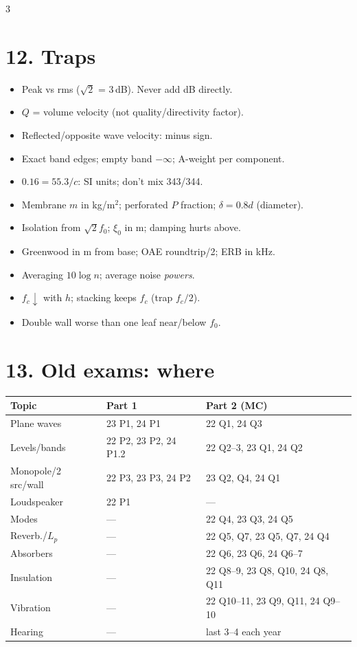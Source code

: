 \documentclass[10pt]{article}
\newcommand{\trap}[1]{\textcolor{trap}{#1}}
\begin{document}
\begin{multicols*}{3}
\section{12. Traps}
\begin{itemize}
\item \trap{Peak vs rms} ($\sqrt2$ = 3\,dB). Never add dB directly.
\item $Q$ = volume velocity (not quality/directivity factor).
\item Reflected/opposite wave velocity: minus sign.
\item Exact band edges; empty band $-\infty$; A-weight per component.
\item $0.16=55.3/c$: SI units; don't mix 343/344.
\item Membrane $m$ in kg/m$^2$; perforated $P$ fraction; $\delta=0.8d$ (diameter).
\item Isolation from $\sqrt2f_0$; $\xi_0$ in m; damping hurts above.
\item Greenwood in m from base; OAE roundtrip/2; ERB in kHz.
\item Averaging $10\log n$; average noise \emph{powers}.
\item $f_c\downarrow$ with $h$; stacking keeps $f_c$ (trap $f_c/2$).
\item Double wall worse than one leaf near/below $f_0$.
\end{itemize}

\section{13. Old exams: where}
{\scriptsize
\begin{tabular}{@{}p{}p{}p{}@{}}
\toprule
Topic & Part 1 & Part 2 (MC)\\\midrule
Plane waves & 23 P1, 24 P1 & 22 Q1, 24 Q3\\
Levels/bands & 22 P2, 23 P2, 24 P1.2 & 22 Q2--3, 23 Q1, 24 Q2\\
Monopole/2 src/wall & 22 P3, 23 P3, 24 P2 & 23 Q2, Q4, 24 Q1\\
Loudspeaker & 22 P1 & ---\\
Modes & --- & 22 Q4, 23 Q3, 24 Q5\\
Reverb./$L_p$ & --- & 22 Q5, Q7, 23 Q5, Q7, 24 Q4\\
Absorbers & --- & 22 Q6, 23 Q6, 24 Q6--7\\
Insulation & --- & 22 Q8--9, 23 Q8, Q10, 24 Q8, Q11\\
Vibration & --- & 22 Q10--11, 23 Q9, Q11, 24 Q9--10\\
Hearing & --- & last 3--4 each year\\\bottomrule
\end{tabular}}

\end{multicols*}
\end{document}
